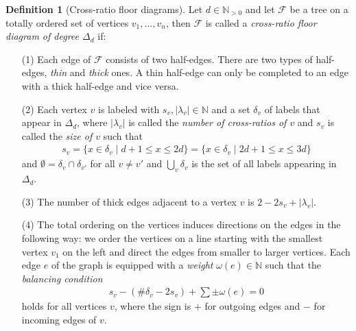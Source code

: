 \documentclass[11pt,reqno,a4]{amsart}
\theoremstyle{dotless}
\theoremstyle{definition}
\newtheorem{definition}[corollary]{Definition}
\begin{document}
\begin{definition}[Cross-ratio floor diagrams]
Let $d\in\mathbb{N}_{>0}$ and let $\mathcal{F}$ be a tree on a totally ordered set of vertices $v_1,\dots,v_n$, then $\mathcal{F}$ is called a \textit{cross-ratio floor diagram of degree $\Delta_d$} if:
\begin{itemize}
\item[(1)] Each edge of $\mathcal{F}$ consists of two half-edges. There are two types of half-edges, \textit{thin} and \textit{thick} ones. A thin half-edge can only be completed to an edge with a thick half-edge and vice versa.
\item[(2)]
Each vertex $v$ is labeled with $s_v,|\lambda_v|\in\mathbb{N}$ and a set $\delta_v$ of labels that appear in $\Delta_d$, where $|\lambda_v|$ is called the \textit{number of cross-ratios of $v$} and $s_v$ is called the \textit{size of $v$} such that 
\begin{align*}
s_v=\lbrace x\in\delta_v\mid d+1\leq x\leq 2d \rbrace = \lbrace x\in\delta_v\mid 2d+1\leq x\leq 3d \rbrace
\end{align*}
and $\emptyset=\delta_v\cap\delta_{v'}$ for all $v\neq v'$ and $\bigcup_v \delta_v$  is the set of all labels appearing in $\Delta_d$.
\item[(3)]
The number of thick edges adjacent to a vertex $v$ is $2-2s_v+|\lambda_v|$.
\item[(4)]
The total ordering on the vertices induces directions on the edges in the following way: we order the vertices on a line starting with the smallest vertex $v_1$ on the left and direct the edges from smaller to larger vertices. Each edge $e$ of the graph is equipped with a \textit{weight} $\omega(e)\in\mathbb{N}$ such that the \textit{balancing condition}
\begin{align*}
s_v-\left(\#\delta_v-2s_v \right)+\sum\pm \omega(e)=0
\end{align*}
holds for all vertices $v$, where the sign is $+$ for outgoing edges and $-$ for incoming edges of $v$.
\end{itemize}
\end{definition}
\end{document}
